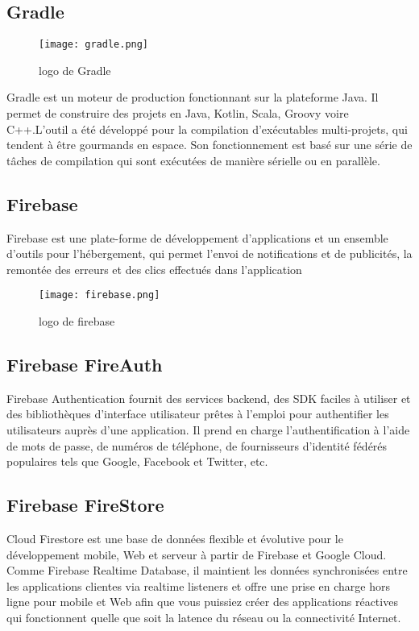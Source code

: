 \subsection{Gradle}
\begin{wrapfigure}{r}{0.25\textwidth} 
    \texttt{[image: gradle.png]}
    \caption{logo de Gradle}
\end{wrapfigure}
Gradle est un moteur de production fonctionnant sur la plateforme Java. Il permet de construire des projets en Java, Kotlin, Scala, Groovy voire C++.L'outil a été développé pour la compilation d'exécutables multi-projets, qui tendent à être gourmands en espace. Son fonctionnement est basé sur une série de tâches de compilation qui sont exécutées de manière sérielle ou en parallèle.
\vfill
\newpage
\cite{wikipediaGradleWikipdia}
\subsection{Firebase}
Firebase est une plate-forme de développement d'applications et un ensemble d'outils pour l'hébergement, qui permet l'envoi de notifications et de publicités, la remontée des erreurs et des clics effectués dans l'application
\begin{figure}[h]
    \centering
    \texttt{[image: firebase.png]}
    \caption{logo de firebase}
\end{figure}
\cite{Firebase}
\subsection{Firebase FireAuth}
Firebase Authentication fournit des services backend, des SDK faciles à utiliser et des bibliothèques d'interface utilisateur prêtes à l'emploi pour authentifier les utilisateurs auprès d'une application. Il prend en charge l'authentification à l'aide de mots de passe, de numéros de téléphone, de fournisseurs d'identité fédérés populaires tels que Google, Facebook et Twitter, etc.
\cite{Firebase}

\subsection{Firebase FireStore}
Cloud Firestore est une base de données flexible et évolutive pour le développement mobile, Web et serveur à partir de Firebase et Google Cloud. Comme Firebase Realtime Database, il maintient les données synchronisées entre les applications clientes via realtime listeners et offre une prise en charge hors ligne pour mobile et Web afin que vous puissiez créer des applications réactives qui fonctionnent quelle que soit la latence du réseau ou la connectivité Internet.
\cite{Firebase}
